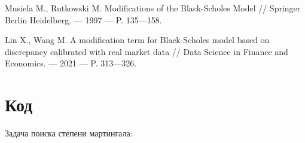 \documentclass[a4paper,12pt]{article}
\theoremstyle{definition}
\begin{document}
\begin{thebibliography}{10}
Musiela M., Rutkowski M. Modifications of the Black-Scholes Model // Springer Berlin Heidelberg. --- 1997 --- P. 135---158.

Lin X., Wang M. A modification term for Black-Scholes model based on discrepancy calibrated with real market data // Data Science in Finance and Economics. --- 2021 --- P. 313---326.

\end{thebibliography}


\appendix

\section{Код}

Задача поиска степени мартингала:\label{code:martingale_root}
\end{document}
